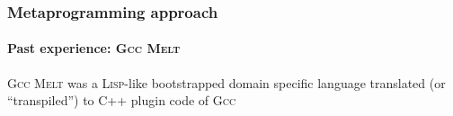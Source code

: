 \documentclass[xcolor=svgnames,final,smaller,a4]{beamer}
\begin{document}
\begin{frame}
    \frametitle{Metaprogramming approach}
    \framesubtitle{Past experience: \textsc{Gcc Melt}}

\textsc{Gcc Melt} was a \textsc{Lisp}-like bootstrapped domain
specific language translated (or ``transpiled'') to C++ plugin
code of \textsc{Gcc}


\end{frame}
\end{document}

